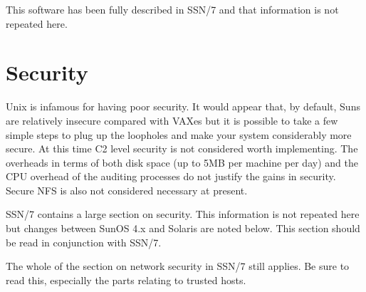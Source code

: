 This software has been fully described in SSN/7 and that information is not
repeated here.


\section{Security}

Unix is infamous for having poor security. It would appear that, by
default, Suns are relatively insecure compared with VAXes but it is possible to
take a few simple steps to plug up the loopholes and make your system
considerably more secure. At this time C2 level security is not considered
worth implementing. The overheads in terms of both disk space (up to 5MB per
machine per day) and the CPU overhead of the auditing processes do not justify
the gains in security. Secure NFS is also not considered necessary at present.

SSN/7 contains a large section on security. This information is not repeated
here but changes between SunOS 4.x and Solaris are noted below. This section
should be read in conjunction with SSN/7.

The whole of the section on network security in SSN/7 still applies.
Be sure to read this, especially the parts relating to trusted hosts.



